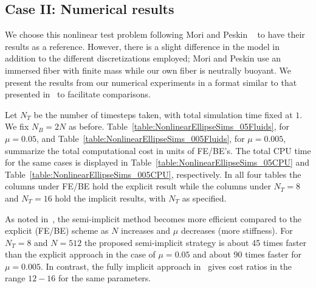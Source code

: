 \subsection{Case II: Numerical results}
We choose this nonlinear test problem following Mori and Peskin ~\cite{MP2008} to have their results as a reference. However, 
there is a  slight difference in the model in addition to the different discretizations employed; Mori and Peskin use an immersed fiber with finite mass while our own fiber is neutrally buoyant.  We present the results from our numerical experiments in a format similar to that presented in~\cite{MP2008} to facilitate comparisons.

Let $N_T$ be the number of timesteps taken, with total simulation time fixed at $1$. We fix $N_B=2N$ as before. 
Table~\ref{table:NonlinearEllipseSims_05Fluids}, for $\mu=0.05$, and Table~\ref{table:NonlinearEllipseSims_005Fluids}, 
for $\mu=0.005$,  summarize the total computational cost in units of FE/BE's. The total CPU time for the same cases is displayed in
  Table~\ref{table:NonlinearEllipseSims_05CPU} and Table~\ref{table:NonlinearEllipseSims_005CPU}, respectively.
  In all four tables the columns under FE/BE hold the explicit result while the columns under $N_T=8$ and $N_T=16$ hold the implicit results, with $N_T$ as specified. 

As noted in~\cite{MP2008}, the semi-implicit method becomes more efficient compared to the explicit (FE/BE) 
scheme as $N$ increases and $\mu$ decreases (more stiffness). For $N_T=8$ and $N=512$ the proposed semi-implicit strategy is about 45 times faster than the explicit approach in the case of $ \mu=0.05$ and about 90 times faster for $\mu=0.005$. In contrast, the fully implicit
approach in~\cite{MP2008} gives cost ratios in the range $12-16$ for the same parameters.


